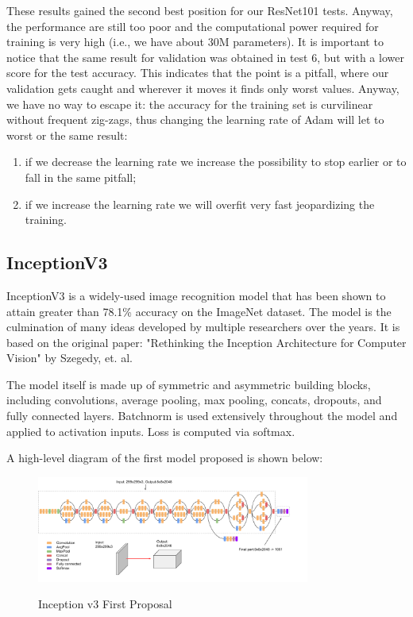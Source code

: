 These results gained the second best position for our ResNet101 tests. Anyway, the performance are still too poor and the computational power required for training is very high (i.e., we have about 30M parameters). It is important to notice that the same result for validation was obtained in test 6, but with a lower score for the test accuracy. This indicates that the point is a pitfall, where our validation gets caught and wherever it moves it finds only worst values.
Anyway, we have no way to escape it: the accuracy for the training set is curvilinear without frequent zig-zags, thus changing the learning rate of Adam will let to worst or the same result:
\begin{enumerate}
\item if we decrease the learning rate we increase the possibility to stop earlier or to fall in the same pitfall;
\item if we increase the learning rate we will overfit very fast jeopardizing the training.
\end{enumerate}


\subsection{InceptionV3}
InceptionV3 is a widely-used image recognition model that has been shown to attain greater than 78.1\% accuracy on the ImageNet dataset. The model is the culmination of many ideas developed by multiple researchers over the years. It is based on the original paper: "Rethinking the Inception Architecture for Computer Vision" by Szegedy, et. al.

The model itself is made up of symmetric and asymmetric building blocks, including convolutions, average pooling, max pooling, concats, dropouts, and fully connected layers. Batchnorm is used extensively throughout the model and applied to activation inputs. Loss is computed via softmax.

A high-level diagram of the first model proposed is shown below:

\begin{figure}[H]
	\centering
	\includegraphics[width=0.8\textwidth]{img/inception/inceptionv3}
	\label{fig:inceptionv3}
	\caption{Inception v3 First Proposal}
\end{figure}

